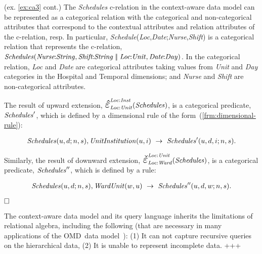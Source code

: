 \documentclass[format=acmsmall, review=false, screen=true]{acmart}
\newcommand{\upext}[3]{\scalebox{1.5}{\ensuremath{\hat{\varepsilon}}}_{#1}^{#2}(#3)}
\newcommand{\downext}[3]{\scalebox{1.5}{\ensuremath{\check{\varepsilon}}}_{#1}^{#2}(#3)}
\newcommand{\boxtheorem}{\ensuremath{\hfill \Box}}
\newcommand{\nit}[1]{{\it #1}}
\newcommand{\omd}{OMD}
\begin{document}
{\begin{example} (ex. \ref{ex:ca3} cont.) \label{ex:extension} The \nit{Schedules} c-relation in the context-aware data model can be represented as a categorical relation with the categorical and non-categorical attributes that correspond to the contextual attributes and relation attributes of the c-relation, resp. In particular, \nit{Schedule}(\nit{Loc},\nit{Date};\nit{Nurse},\nit{Shift}) is a categorical relation that represents the c-relation, $\nit{Schedules}(\nit{Nurse}\!\!:\!\!\nit{String},\nit{Shift}\!\!:\!\!\nit{String}\;|\!|\;\nit{Loc}\!\!:\!\!\nit{Unit},\nit{Date}\!\!:\!\!\nit{Day})$. In the categorical relation, {\it Loc} and {\it Date} are categorical attributes taking values from {\it Unit} and {\it Day} categories in the {\sf Hospital} and {\sf Temporal} dimensions; and {\it Nurse} and {\it Shift} are non-categorical attributes.

The result of upward extension, $\upext{\nit{Loc}:\nit{Unit}}{\nit{Loc}:\nit{Inst}}{\nit{Schedules}}$, is a categorical predicate, ${\it Schedules}'$, which is defined by a dimensional rule of the form~(\ref{frm:dimensional-rule}):

\vspace{-4mm}
\begin{align*}
{\it Schedules}(u,d;n,s), \nit{UnitInstitution}(u,i) ~\rightarrow~ {\it Schedules}'(u,d,i;n,s).
\end{align*}
\vspace{-4mm}

\noindent Similarly, the result of downward extension, $\downext{\nit{Loc}:\nit{Ward}}{\nit{Loc}:\nit{Unit}}{\nit{Schedules}}$, is a categorical predicate, $\nit{Schedules}''$, which is defined by a rule:

\vspace{-4mm}
\begin{align*}
\nit{Schedules}(u,d;n,s), \nit{WardUnit}(w,u) ~\rightarrow~ \nit{Schedules}''(u,d,w;n,s).
\end{align*}

\vspace*{-6mm}\boxtheorem
\end{example}

The context-aware data model and its query language inherits the limitations of relational algebra, including the following (that are necessary in many applications of the \omd \ data model~\cite{milani14,milani15ruleml}): (1) It can not capture recursive queries on the hierarchical data, (2) It is unable to represent incomplete data.
+++}
\end{document}
